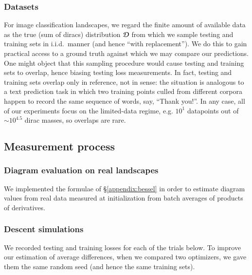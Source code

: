             \subsubsection{Datasets}
                For image classification landscapes, we regard the finite amount of
                available data as the true (sum of diracs) distribution $\mathcal{D}$ from
                which we sample testing and training sets in i.i.d.\ manner (and hence
                ``with replacement'').  We do this to gain practical access to a
                ground truth against which we may compare our predictions.  One
                might object that this sampling procedure would cause testing and
                training sets to overlap, hence biasing testing loss measurements.  In
                fact, testing and training sets overlap only in reference, not in
                sense: the situation is analogous to a text prediction task in
                which two training points culled from different corpora happen to
                record the same sequence of words, say, ``Thank you!''.  In any
                case, all of our experiments focus on the limited-data regime, e.g.
                $10^1$ datapoints out of $\sim 10^{4.5}$ dirac masses, so overlaps
                are rare.

        \subsection{Measurement process}                                \label{appendix:measure}

            \subsubsection{Diagram evaluation on real landscapes}
                We implemented the formulae of \S\ref{appendix:bessel} in order
                to estimate diagram values from real data measured at
                initialization from batch averages of products of derivatives.

            \subsubsection{Descent simulations}
                We recorded testing and training losses for each of the trials below.  To
                improve our estimation of average differences, when we compared two
                optimizers, we gave them the same random seed (and hence the same
                training sets).

